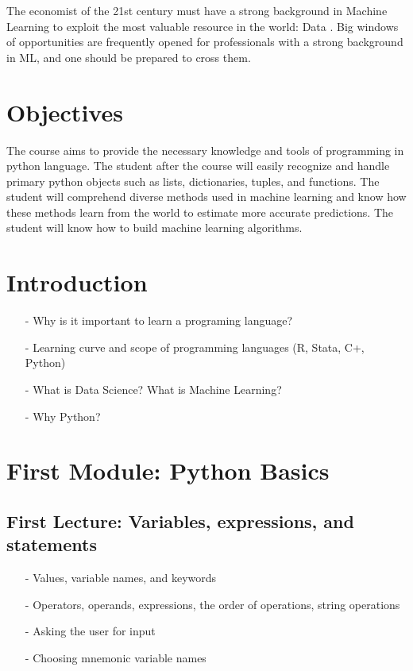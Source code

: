 The economist of the 21st century must have a strong background in Machine Learning to exploit the most valuable resource in the world: Data . Big windows of opportunities are frequently opened for professionals with a strong background in ML, and one should be prepared to cross them.

\section*{Objectives}

The course aims to provide the necessary knowledge and tools of programming in python language. The student after the course will easily recognize and handle primary python objects such as lists, dictionaries, tuples, and functions.
The student will comprehend diverse methods used in machine learning and know how these methods learn from the world to estimate more accurate predictions.
The student will know how to build machine learning algorithms.

\section*{Introduction}
  
\begin{itemize}
\item[-] Why is it important to learn a programing language?
\item[-] Learning curve and scope of programming languages (R, Stata, C+, Python)
\item[-] What is Data Science? What is Machine Learning?
\item[-] Why Python?
\end{itemize}

\section*{First Module: Python Basics}

\subsection*{First Lecture: Variables, expressions, and statements}
\begin{itemize}
\item[-]	Values, variable names, and keywords
\item[-]	Operators, operands, expressions, the order of operations, string operations
\item[-]	Asking the user for input
\item[-]	Choosing mnemonic variable names
\end{itemize}

